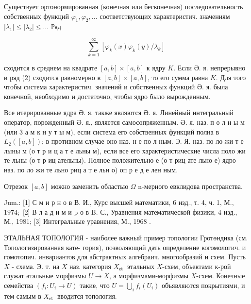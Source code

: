 \documentclass[10pt]{article}
\begin{document}
Существует ортонормированная (конечная или бесконечная) последовательность собственных функций $\varphi_{1}, \varphi_{2}, \ldots$ соответствующих характеристич. значениям $\left|\lambda_{1}\right| \leqslant\left|\lambda_{2}\right| \leqslant . .$. Ряд



\[

\sum_{k=1}^{\infty}\left[\varphi_{k}(x) \varphi_{k}(y) / \lambda_{k}\right]

\]



сходится в среднем на квадрате $[a, b] \times[a, b]$ к ядру $K$. Если Ә. я. непрерывно и ряд (2) сходится равномерно в $[a, b] \times[a, b]$, то его сумма равна $K$. Для того чтобы система характеристич. значений и собственных функций Ә. я. была конечной, необходимо и достаточно, чтобы ядро было вырожденным.



Все итерированные ядра Ә. я. также являются Ә. я. Линейный интегральный оператор, порожденный Ә. я., является самосопряженным. Ә. я. наз. п о л н ы м (или 3 а м к н у т ы м), если система его собственных функций полна в $L_{2}([a, b])$; в противном случае оно наз. н е по л ным. Э. Я. наз. по ло жи т е лыны м (о т р и ц а т е льны м), если все его характеристические числа поло жи те льны (о т р иц ательны). Полное положительно е (о т риц ате льно е) ядро наз. по ло жи те льно риц а т е льн о) оп р е д е лен ным.



Отрезок $[a, b]$ можно заменить областью $\Omega$ n-мерного евклидова пространства.



Jum.: [1] С м и р н о в В. И., Курс высшей математики, 6 изд., т. 4, ч. 1, М., $1974 ;$ [2] В л а д и м и p о в B. С., Уравнения математической физики, 4 изд., М., 1981; [3] Интегральные уравнения, М., 1968 .



ЭТАЛЬНАЯ ТОПОЛОГИЯ - наиболее важный пример топологии Гротөндика (см. Топологизированная кате- гория), позволяющий дать определение когомологич. и гомотопич. инвариантов для абстрактных алгебраич. многообразий и схем. Пусть $X$ - схема. Э. т. на $X$ наз. категория $X_{\text {et }}$ этальных $X$-схем, объектами к-рой служат әтальные морфизмы $U \rightarrow X$, а морфизмами-морфизмы $X$-схем. Конечные семейства $\left(f_{i}: U_{i} \rightarrow U\right)$ такие, что $U=\bigcup_{i} f_{i}\left(U_{i}\right)$ объявляются покрытиями, и тем самым в $X_{\text {et }}$ вводится топология.
\end{document}
